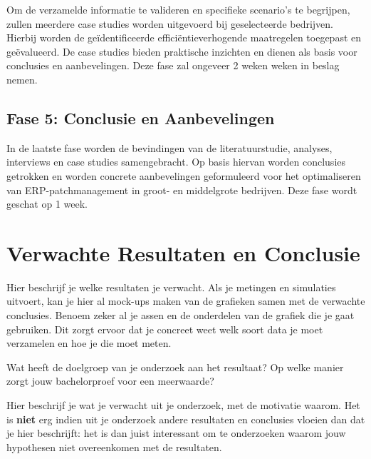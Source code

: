 Om de verzamelde informatie te valideren en specifieke scenario's te begrijpen, zullen meerdere case studies worden uitgevoerd bij geselecteerde bedrijven. Hierbij worden de geïdentificeerde efficiëntieverhogende maatregelen toegepast en geëvalueerd. De case studies bieden praktische inzichten en dienen als basis voor conclusies en aanbevelingen. Deze fase zal ongeveer 2 weken weken in beslag nemen.

\subsection{Fase 5: Conclusie en Aanbevelingen}

In de laatste fase worden de bevindingen van de literatuurstudie, analyses, interviews en case studies samengebracht. Op basis hiervan worden conclusies getrokken en worden concrete aanbevelingen geformuleerd voor het optimaliseren van ERP-patchmanagement in groot- en middelgrote bedrijven. Deze fase wordt geschat op 1 week.

\section{Verwachte Resultaten en Conclusie}%
\label{sec:verwachte-resultaten}

Hier beschrijf je welke resultaten je verwacht. Als je metingen en simulaties uitvoert, kan je hier al mock-ups maken van de grafieken samen met de verwachte conclusies. Benoem zeker al je assen en de onderdelen van de grafiek die je gaat gebruiken. Dit zorgt ervoor dat je concreet weet welk soort data je moet verzamelen en hoe je die moet meten.

Wat heeft de doelgroep van je onderzoek aan het resultaat? Op welke manier zorgt jouw bachelorproef voor een meerwaarde?

Hier beschrijf je wat je verwacht uit je onderzoek, met de motivatie waarom. Het is \textbf{niet} erg indien uit je onderzoek andere resultaten en conclusies vloeien dan dat je hier beschrijft: het is dan juist interessant om te onderzoeken waarom jouw hypothesen niet overeenkomen met de resultaten.
